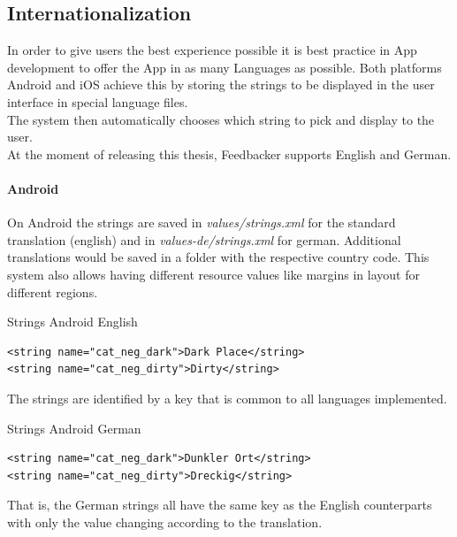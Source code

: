\subsection{Internationalization}
In order to give users the best experience possible it is best practice in App development to offer the App in as many Languages as possible. Both platforms Android and iOS achieve this by storing the strings to be displayed in the user interface in special language files.\\
The system then automatically chooses which string to pick and display to the user.\\
At the moment of releasing this thesis, Feedbacker supports English and German.

\paragraph{Android}
On Android the strings are saved in \textit{values/strings.xml} for the
standard translation (english) and in \textit{values-de/strings.xml} for german. Additional translations would be saved in a folder with the respective country code. This system also allows having different resource values like margins in layout for different regions.\\
\begin{listing}[H]
  \caption{Strings Android English}
  \label{mint:strings_and_eng}
    \begin{verbatim}
<string name="cat_neg_dark">Dark Place</string>
<string name="cat_neg_dirty">Dirty</string>
    \end{verbatim}
\end{listing}
The strings are identified by a key that is common to all languages implemented.
\begin{listing}[H]
  \caption{Strings Android German}
  \label{mint:strings_and_ger}
    \begin{verbatim}
<string name="cat_neg_dark">Dunkler Ort</string>
<string name="cat_neg_dirty">Dreckig</string>
    \end{verbatim}
\end{listing}
That is, the German strings all have the same key as the English counterparts with only the value changing according to the translation.\\


